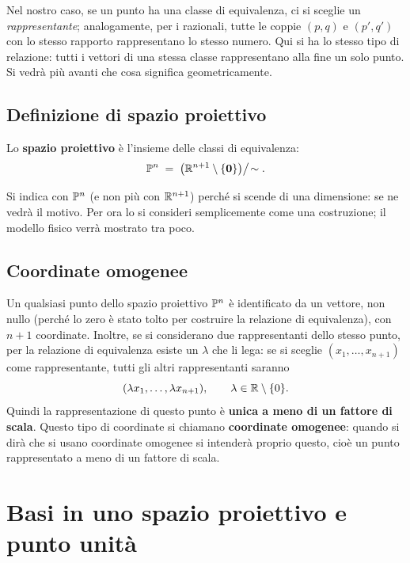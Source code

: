 Nel nostro caso, se un punto ha una classe di equivalenza, ci si sceglie un \emph{rappresentante}; analogamente, per i razionali, tutte le coppie $(p,q)$ e $(p',q')$ con lo stesso rapporto rappresentano lo stesso numero. Qui si ha lo stesso tipo di relazione: tutti i vettori di una stessa classe rappresentano alla fine un solo punto. Si vedrà più avanti che cosa significa geometricamente.

\subsection{Definizione di spazio proiettivo}

\begin{definizione}
Lo \textbf{spazio proiettivo} è l'insieme delle classi di equivalenza:
\[
  \mathbb{P}^{n} \;=\; \bigl(\mathbb{R}^{n+1}\setminus\{\mathbf{0}\}\bigr)\big/\!\sim .
\]
\end{definizione}

Si indica con $\mathbb{P}^n$ (e non più con $\mathbb{R}^{n+1}$) perché si scende di una dimensione: se ne vedrà il motivo. Per ora lo si consideri semplicemente come una costruzione; il modello fisico verrà mostrato tra poco.

\subsection{Coordinate omogenee}

Un qualsiasi punto dello spazio proiettivo $\mathbb{P}^n$ è identificato da un vettore, non nullo (perché lo zero è stato tolto per costruire la relazione di equivalenza), con $n+1$ coordinate. Inoltre, se si considerano due rappresentanti dello stesso punto, per la relazione di equivalenza esiste un $\lambda$ che li lega: se si sceglie $(x_1,\dots,x_{n+1})$ come rappresentante, tutti gli altri rappresentanti saranno
\[
  (\lambda x_1,\dots,\lambda x_{n+1}),\qquad \lambda\in\mathbb{R}\setminus\{0\}.
\]
Quindi la rappresentazione di questo punto è \textbf{unica a meno di un fattore di scala}. Questo tipo di coordinate si chiamano \textbf{coordinate omogenee}: quando si dirà che si usano coordinate omogenee si intenderà proprio questo, cioè un punto rappresentato a meno di un fattore di scala.

\section{Basi in uno spazio proiettivo e punto unità}

